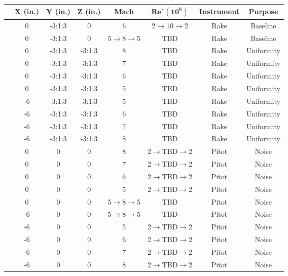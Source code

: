 \setcounter{rownum}{0}
\begin{table}[ht!]
    \centering
    \begin{tabular}{|>{\stepcounter{rownum}\therownum}c|c|c|c|c|c|c|c|}
        \hline
        \multicolumn{1}{|c|}{\textbf{Run}} & \textbf{X (in.)} & \textbf{Y (in.)} & \textbf{Z (in.)} & \textbf{Mach} & $\boldsymbol{Re' \, (10^6)}$ & \textbf{ Instrument} & \textbf{Purpose} \\ \hline
        & 0 & -3:1:3 & 0 & 6 & 2$\to$10$\to$2 & Rake & Baseline\\ \hline
        & 0 & -3:1:3 & 0 & 5$\to$8$\to$5 & TBD & Rake & Baseline\\ \hline
        & 0 & -3:1:3 & -3:1:3 & 8 & TBD & Rake & Uniformity\\ \hline
        & 0 & -3:1:3 & -3:1:3 & 7 & TBD & Rake & Uniformity\\ \hline
        & 0 & -3:1:3 & -3:1:3 & 6 & TBD & Rake & Uniformity\\ \hline
        & 0 & -3:1:3 & -3:1:3 & 5 & TBD & Rake & Uniformity\\ \hline
        & -6 & -3:1:3 & -3:1:3 & 5 & TBD & Rake & Uniformity\\ \hline
        & -6 & -3:1:3 & -3:1:3 & 6 & TBD & Rake & Uniformity\\ \hline
        & -6 & -3:1:3 & -3:1:3 & 7 & TBD & Rake & Uniformity\\ \hline
        & -6 & -3:1:3 & -3:1:3 & 8 & TBD & Rake & Uniformity\\ \hline
        & 0 & 0 & 0 & 8 & 2$\to$TBD$\to$2 & Pitot & Noise\\ \hline
        & 0 & 0 & 0 & 7 & 2$\to$TBD$\to$2 & Pitot & Noise\\ \hline
        & 0 & 0 & 0 & 6 & 2$\to$TBD$\to$2 & Pitot & Noise\\ \hline
        & 0 & 0 & 0 & 5 & 2$\to$TBD$\to$2 & Pitot & Noise\\ \hline
        & 0 & 0 & 0 & 5$\to$8$\to$5 & TBD & Pitot & Noise\\ \hline
        & -6 & 0 & 0 & 5$\to$8$\to$5 & TBD & Pitot & Noise\\ \hline
        & -6 & 0 & 0 & 5 & 2$\to$TBD$\to$2 & Pitot & Noise\\ \hline
        & -6 & 0 & 0 & 6 & 2$\to$TBD$\to$2 & Pitot & Noise\\ \hline
        & -6 & 0 & 0 & 7 & 2$\to$TBD$\to$2 & Pitot & Noise\\ \hline
        & -6 & 0 & 0 & 8 & 2$\to$TBD$\to$2 & Pitot & Noise\\ \hline

\end{tabular}
\end{table}
